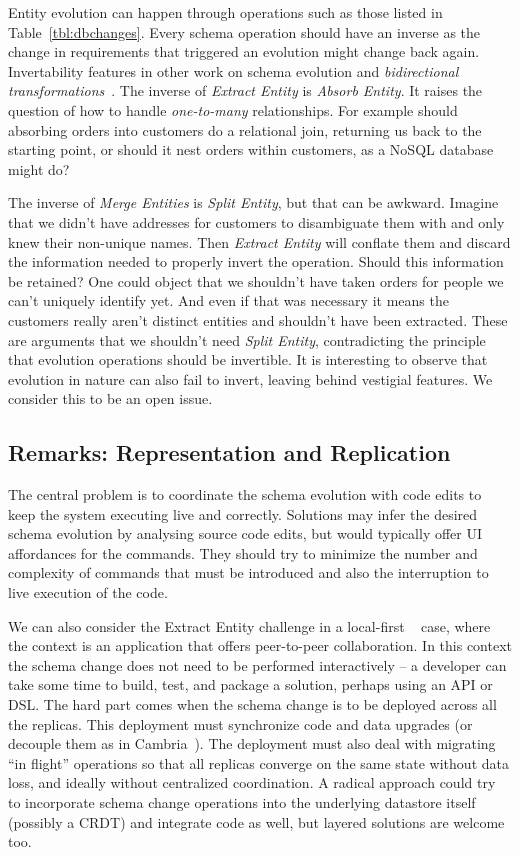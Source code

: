 \documentclass[english,crc]{programming}
\begin{document}
Entity evolution can happen through operations such as those listed in
Table~\ref{tbl:dbchanges}. Every schema operation should have an inverse as the
change in requirements that triggered an evolution might change back again.
Invertability features in other work on schema evolution and \emph{bidirectional transformations}~\cite{Foster2007, herrmann17, chillon22}.
The inverse of \emph{Extract Entity} is \emph{Absorb Entity}. It raises the question of how
to handle \emph{one-to-many} relationships. For example should absorbing orders into customers
do a relational join, returning us back to the starting point, or should it nest orders within
customers, as a NoSQL database might do?

The inverse of \emph{Merge Entities} is \emph{Split Entity}, but that can be awkward.
Imagine that we didn't have addresses for customers to disambiguate them with and only knew
their non-unique names. Then \emph{Extract Entity} will conflate them and discard the
information needed to properly invert the operation. Should this information be retained?
One could object that we shouldn't have taken orders for people we can't uniquely identify
yet. And even if that was necessary it means the customers really aren't distinct entities
and shouldn't have been extracted. These are arguments that we shouldn't need \textit{Split
Entity}, contradicting the principle that evolution operations should be invertible.
It is interesting to observe that evolution in nature can also fail to invert, leaving
behind vestigial features. We consider this to be an open issue.

\subsection*{Remarks: Representation and Replication}
The central problem is to coordinate the schema evolution with code edits to keep the system
executing live and correctly. Solutions may infer the desired schema evolution by analysing
source code edits, but would typically offer UI affordances for the commands. They should
try to minimize the number and complexity of commands that must be introduced and also the
interruption to live execution of the code.

We can also consider the Extract Entity challenge in a local-first ~\cite{localfirst} case, where the context is an application that offers peer-to-peer collaboration. In this context the schema change does not need
to be performed interactively -- a developer can take some time to build, test, and package a
solution, perhaps using an API or DSL. The hard part comes when the schema change is to
be deployed across all the replicas. This deployment must synchronize code and data upgrades
(or decouple them as in Cambria~\cite{Cambria}). The deployment must also deal with
migrating ``in flight'' operations so that all replicas converge on the same state
without data loss, and ideally without centralized coordination. A radical approach
could try to incorporate schema change operations into the underlying datastore
itself (possibly a CRDT) and integrate code as well, but layered solutions are welcome too.
\end{document}
